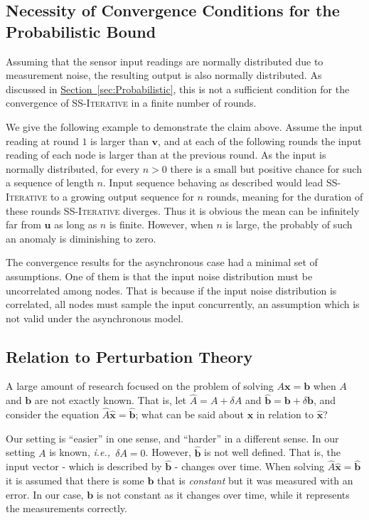 \documentclass[preprint,12pt]{elsarticle}
\newcommand{\ie}{\emph{i.e.,\ }}
\newcommand{\namedref}[2]{\hyperref[#2]{#1~\ref*{#2}}}
\newcommand{\sectionref}[1]{\namedref{Section}{#1}}
\newcommand{\syncAlg}{\textsc{SS-Iterative}\xspace}
\newcommand{\uu}{\mathbf{u}}
\newcommand{\vv}{\mathbf{v}}
\newcommand{\xx}{\mathbf{x}}
\newcommand{\bb}{\mathbf{b}}
\begin{document}
\subsection{Necessity of Convergence Conditions for the Probabilistic Bound}
Assuming that the sensor input readings are normally distributed due to measurement noise, the resulting output is also normally distributed. As discussed in \sectionref{sec:Probabilistic}, this is not a sufficient condition for the convergence of \syncAlg in a finite number of rounds.

We give the following example to demonstrate the claim above. Assume the input reading at round $1$ is larger than $\vv$, and at each of the following rounds the input reading of each node is larger than at the previous round. As the input is normally distributed, for every $n>0$ there is a small but positive chance for such a sequence of length $n$. Input sequence behaving as described would lead \syncAlg to a growing output sequence for $n$ rounds, meaning for the duration of these rounds \syncAlg diverges. Thus it is obvious the mean can be infinitely far from $\uu$ as long as $n$ is finite. However, when $n$ is large, the probably of such an anomaly is diminishing to zero.

The convergence results for the asynchronous case had a minimal set of assumptions. One of them is that the input noise distribution must be uncorrelated among nodes. That is because if the input noise distribution is correlated, all nodes
must sample the input concurrently, an assumption which is not valid under the asynchronous model. 

\subsection{Relation to Perturbation Theory}
A large amount of research focused on the problem of solving $A\xx=\bb$ when $A$ and
$\bb$ are not exactly known. That is, let $\hat{A}=A+\delta A$ and
$\hat{\bb} = \bb+\delta \bb$, and consider the equation
$\hat{A}\hat{\xx}=\hat{\bb}$; what can be said about $\xx$ in
relation to $\hat{\xx}$?

Our setting is ``easier'' in one sense, and ``harder'' in a
different sense. In our setting $A$ is known, \ie $\delta A
= 0$. However, $\hat{\bb}$ is not well defined. That is, the input
vector - which is described by $\hat{\bb}$ - changes over time.
When solving $\hat{A}\hat{\xx}=\hat{\bb}$ it is assumed that there
is some $\bb$ that is \emph{constant} but it was measured with an
error. In our case, $\bb$ is not constant as it changes over time,
while it represents the measurements correctly.
\end{document}
